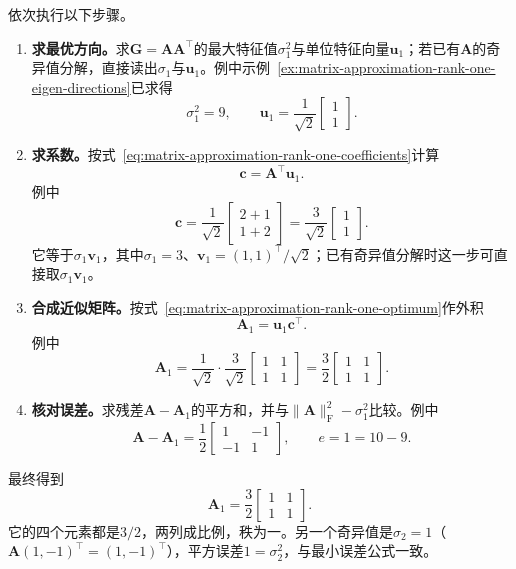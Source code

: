 依次执行以下步骤。
\begin{enumerate}
 \item \textbf{求最优方向。}求$\bm G=\bm A\bm A^\top$的最大特征值$\sigma_1^2$与单位特征向量$\bm u_1$；若已有$\bm A$的奇异值分解，直接读出$\sigma_1$与$\bm u_1$。例中示例~\ref{ex:matrix-approximation-rank-one-eigen-directions}已求得
 \[
  \sigma_1^2=9,\qquad \bm u_1=\frac1{\sqrt2}\begin{bmatrix}1\\1\end{bmatrix}.
 \]

 \item \textbf{求系数。}按式~\eqref{eq:matrix-approximation-rank-one-coefficients}计算
 \[
  \bm c=\bm A^\top\bm u_1 .
 \]
 例中
 \[
  \bm c=\frac1{\sqrt2}\begin{bmatrix}2+1\\1+2\end{bmatrix}=\frac3{\sqrt2}\begin{bmatrix}1\\1\end{bmatrix}.
 \]
 它等于$\sigma_1\bm v_1$，其中$\sigma_1=3$、$\bm v_1=(1,1)^\top/\sqrt2$；已有奇异值分解时这一步可直接取$\sigma_1\bm v_1$。

 \item \textbf{合成近似矩阵。}按式~\eqref{eq:matrix-approximation-rank-one-optimum}作外积
 \[
  \bm A_1=\bm u_1\bm c^\top .
 \]
 例中
 \[
  \bm A_1=\frac1{\sqrt2}\cdot\frac3{\sqrt2}\begin{bmatrix}1&1\\1&1\end{bmatrix}=\frac32\begin{bmatrix}1&1\\1&1\end{bmatrix}.
 \]

 \item \textbf{核对误差。}求残差$\bm A-\bm A_1$的平方和，并与$\lVert\bm A\rVert_{\mathrm F}^2-\sigma_1^2$比较。例中
 \[
  \bm A-\bm A_1=\frac12\begin{bmatrix}1&-1\\-1&1\end{bmatrix},\qquad
  e=1=10-9 .
 \]
\end{enumerate}

最终得到
\[
 \bm A_1=\frac32\begin{bmatrix}1&1\\1&1\end{bmatrix}.
\]
它的四个元素都是$3/2$，两列成比例，秩为一。另一个奇异值是$\sigma_2=1$（$\bm A(1,-1)^\top=(1,-1)^\top$），平方误差$1=\sigma_2^2$，与最小误差公式一致。

